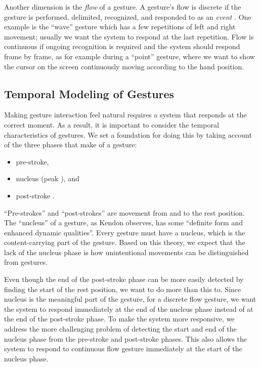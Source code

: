 \documentclass[conference]{IEEEtran}
\begin{document}
Another dimension is the \textit{flow} of a gesture. A gesture's flow is
discrete if the gesture is performed, delimited, recognized, and responded to
as an \textit{event} \cite{wobbrock09}. One example is the ``wave'' gesture
which has a few repetitions of left and right movement; usually we want the system to
respond at the last repetition. Flow is continuous if ongoing recognition is required
and the system should respond frame by frame, as for example during a
``point'' gesture, where we want to show the cursor on the screen
continuously moving according to the hand position. 

\subsection{Temporal Modeling of Gestures}
Making gesture interaction feel natural requires a system that responds at the
correct moment. As a result, it is important to consider the temporal
characteristics of gestures. We set a foundation for doing this by taking
account of the three phases that make of a gesture:
\begin{itemize}
  \item pre-stroke,
  \item nucleus (peak \cite{mcneill82}), and
  \item post-stroke \cite{Pavlovic97}.
\end{itemize}

``Pre-strokes'' and ``post-strokes'' are movement from and to the
rest position. The ``nucleus'' of a gesture,
as Kendon \cite{kendon86} observes, has some ``definite form and enhanced dynamic
qualities''. Every gesture must have a nucleus, which is the content-carrying
part of the gesture. Based on this theory, we expect that the lack of the
nucleus phase is how unintentional movements can be distinguished from gestures. 

Even though the end of the
post-stroke phase can be more easily detected by finding the start of the
rest position, we want to do more than this to. Since nucleus is the meaningful
part of the gesture, for a discrete flow gesture, we want the system to respond immediately at the end of the nucleus
phase instead of at the end of the post-stroke phase. To make the system more responsive,
we address the more challenging problem of detecting the start and end of the nucleus phase from the pre-stroke
and post-stroke phases. This also allows the system to respond to continuous
flow gesture immediately at the start of the nucleus phase.
\end{document}
